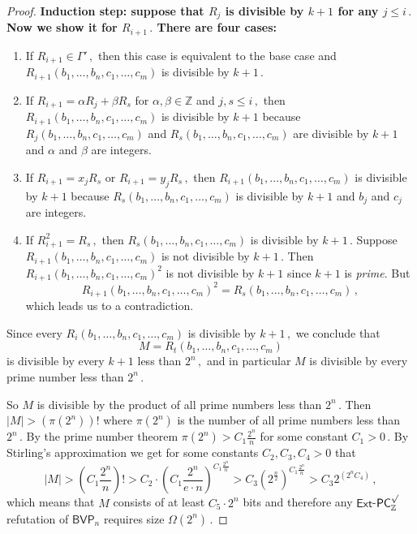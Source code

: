 \documentclass[11pt]{article}
\newcommand{\Z}{{\mathbb Z}}
\begin{document}
\begin{proof}
\bfseries Induction step: \mdseries suppose that $R_j$ is divisible by $k + 1$ for any %
$j \le i\,.$ %
 Now we show it for %
$R_{i + 1}\,.$ %
 There are four cases:
\begin{enumerate}
    \item If %
$R_{i + 1} \in \Gamma'\,,$ %
 then this case is equivalent to the base case and $R_{i + 1}(b_1, \ldots, b_n, c_1, \ldots, c_m)$ is divisible by %
$k + 1\,.$ %
    \item If $R_{i + 1} = \alpha R_j + \beta R_s$ for $\alpha, \beta \in \Z$ and %
$j, s \le i\,,$ %
 then
    $R_{i + 1}(b_1, \ldots, b_n, c_1, \ldots, c_m)$ is divisible by $k + 1$ because $R_j(b_1, \ldots, b_n, c_1, \ldots, c_m)$ and $R_s(b_1, \ldots, b_n, c_1, \ldots, c_m)$ are divisible by $k + 1$ and $\alpha$ and $\beta$ are integers.
    \item If $R_{i + 1} = x_j R_s$ or %
$R_{i + 1} = y_j R_s\,,$ %
 then $R_{i + 1}(b_1, \ldots, b_n, c_1, \ldots, c_m)$ is divisible by $k + 1$ because $R_s(b_1, \ldots, b_n, c_1, \ldots, c_m)$ is divisible by $k + 1$ and $b_j$ and $c_j$ are integers.
    \item If %
$R_{i + 1}^2 = R_s\,,$ %
 then $R_s(b_1, \ldots, b_n, c_1, \ldots, c_m)$ is divisible by %
$k + 1\,.$ %
 Suppose \\ $R_{i + 1}(b_1, \ldots, b_n, c_1, \ldots, c_m)$ is not divisible by %
$k + 1\,.$ %
 Then $R_{i + 1}(b_1, \ldots, b_n, c_1, \ldots, c_m)^2$ is not divisible by $k + 1$ since $k + 1$ is \emph{prime}. But %
%
$$R_{i + 1}(b_1, \ldots, b_n, c_1, \ldots, c_m)^2 = R_s(b_1, \ldots, b_n, c_1, \ldots, c_m)\,,$$ %
which leads us to a contradiction. 
\end{enumerate}
Since every $R_{i}(b_1, \ldots, b_n, c_1, \ldots, c_m)$ is divisible by %
$k + 1\,,$ %
 we conclude that
%
$$M = R_{t}(b_1, \ldots, b_n,  c_1, \ldots, c_m)$$   %
is divisible by every $k + 1$ less than %
$2^n\,,$ %
 and in particular  $M$ is divisible by every prime number less than %
$2^n\,.$ %


So $M$ is divisible by the product of all prime numbers less than %
$2^n\,.$ %
 Then $|M| > (\pi(2^n))!$ where $\pi(2^n)$ is the number of all prime numbers less than %
$2^n\,.$ %
 By the prime number theorem $\pi(2^n) > C_1 \frac{2^n}{n}$ for some constant %
$C_1 > 0\,.$ %
 By Stirling's approximation we get for some constants $C_2, C_3, C_4 > 0$ that
$$
%
|M| > \left(C_1 \frac{2^n}{n}\right)! > C_2 \cdot \left(C_1  \frac{2^n}{e \cdot n}\right)^{C_1  \frac{2^n}{n}} > C_3 \left(2^{\frac{n}{2}}\right)^{C_1  \frac{2^n}{n}} > C_3 2^{(2^n C_4)}\,, %
$$
which means that $M$ consists of at least $C_5 \cdot 2^n$ bits and therefore any $\mathsf{Ext}$-$\mathsf{PC}^{\surd}_{\Z}$ refutation of $\mathsf{BVP}_n$  requires size %
$\Omega(2^n)\,.$ %
\end{proof}
\end{document}

